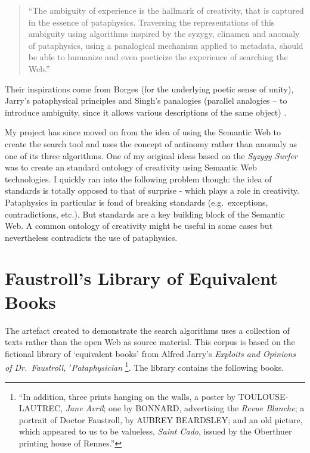 \begin{quote}
  ``The ambiguity of experience is the hallmark of creativity, that is captured in the essence of pataphysics. Traversing the representations of this ambiguity using algorithms inspired by the syzygy, clinamen and anomaly of pataphysics, using a panalogical mechanism applied to metadata, should be able to humanize and even poeticize the experience of searching the Web.''\autocite{Hendler2013}
\end{quote}

Their inspirations come from Borges \autocite{Borges2000} (for the underlying poetic sense of unity), Jarry's pataphysical principles \autocite{Jarry1996} and Singh's panalogies (parallel analogies – to introduce ambiguity, since it allows various descriptions of the same object) \autocite{Singh2005}.

My project has since moved on from the idea of using the Semantic Web to create the search tool and uses the concept of antinomy rather than anomaly as one of its three algorithms. One of my original ideas based on the \textit{Syzygy Surfer} was to create an standard ontology of creativity using Semantic Web technologies. I quickly ran into the following problem though: the idea of standards is totally opposed to that of surprise - which plays a role in creativity. Pataphysics in particular is fond of breaking standards (e.g.\ exceptions, contradictions, etc.). But standards are a key building block of the Semantic Web. A common ontology of creativity might be useful in some cases but nevertheless contradicts the use of pataphysics.


\section{Faustroll's Library of Equivalent Books}
\label{se:faustlib}

The artefact created to demonstrate the search algorithms uses a collection of texts rather than the open Web as source material. This corpus is based on the fictional library of `equivalent books' from Alfred Jarry's \emph{Exploits and Opinions of Dr.\ Faustroll, $'$Pataphysician} \citeyear[p.10-12]{Jarry1996}\footnote{``In addition, three prints hanging on the walls, a poster by TOULOUSE-LAUTREC, \emph{Jane Avril}; one by BONNARD, advertising the \emph{Revue Blanche}; a portrait of Doctor Faustroll, by AUBREY BEARDSLEY\@; and an old picture, which appeared to us to be valueless, \emph{Saint Cado}, issued by the Oberthuer printing house of Rennes.''\parencite[p.12]{Jarry1996}}. The library contains the following books.

